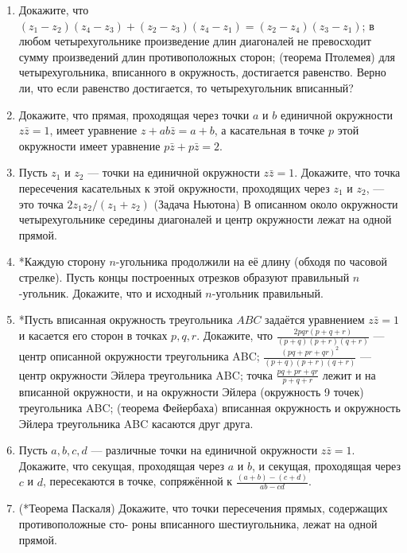 \begin{enumerate}
\item Докажите, что \ipunkt $(z_1 - z_2)(z_4 - z_3) + (z_2 - z_3)(z_4 - z_1) = (z_2 - z_4)(z_3 - z_1)$;
\ipunkt в любом четырехугольнике произведение длин диагоналей не превосходит сумму произведений длин
противоположных сторон; \ipunkt (теорема Птолемея) для четырехугольника, вписанного в окружность, достигается
равенство. \ipunkt Верно ли, что если равенство достигается, то четырехугольник вписанный?
\item Докажите, что прямая, проходящая через точки $a$ и $b$ единичной окружности $z\bar z = 1$, имеет 
уравнение $z + ab\bar z = a + b$, а касательная в точке $p$ этой окружности имеет уравнение $p\bar z + p\bar z = 2$.
\item \ipunkt Пусть $z_1$ и $z_2$ --- точки на единичной окружности $z\bar z = 1$. Докажите, что точка пересечения касательных к этой окружности, проходящих через $z_1$ и $z_2$, --- это точка $2z_1z_2/(z_1+z_2)$
\ipunkt (Задача Ньютона) В описанном
около окружности четырехугольнике середины диагоналей и центр окружности лежат на одной прямой.
\item *Каждую сторону $n$-угольника продолжили на её длину (обходя по часовой стрелке). Пусть концы
построенных отрезков образуют правильный $n$-угольник. Докажите, что и исходный $n$-угольник правильный.
\item *Пусть вписанная окружность треугольника $ABC$ задаётся уравнением $z\bar z = 1$ и касается его 
сторон в точках $p, q, r$. Докажите, что \ipunkt $\frac{2pqr(p+q+r)}{(p+q)(p+r)(q+r)}$ --- центр описанной окружности треугольника ABC; \ipunkt $\frac{(pq+pr+qr)^2}{(p+q)(p+r)(q+r)}$ --- центр окружности Эйлера треугольника ABC; \ipunkt точка $\frac{pq+pr+qr}{p+q+r}$ лежит и на вписанной окружности, и на окружности Эйлера (окружность 9 точек) треугольника ABC; \ipunkt (теорема Фейербаха) вписанная окружность и окружность Эйлера треугольника ABC касаются друг друга.
\item \ipunkt Пусть $a, b, c, d$ --- различные точки на единичной окружности $z\bar z = 1$. Докажите, что секущая,
проходящая через $a$ и $b$, и секущая, проходящая через $c$ и $d$, пересекаются в точке, сопряжённой к
$\frac{(a+b)-(c+d)}{ab-cd}$.
\item (*Теорема Паскаля) Докажите, что точки пересечения прямых, содержащих противоположные сто-
роны вписанного шестиугольника, лежат на одной прямой.



\end{enumerate}




